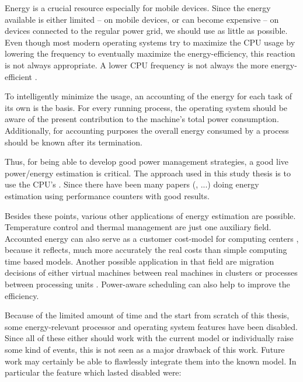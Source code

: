 
Energy is a crucial resource especially for mobile devices. Since the energy
available is either limited -- on mobile devices, or can become expensive -- on
devices connected to the regular power grid, we should use as little as
possible. Even though most modern operating systems try to maximize the CPU
usage by lowering the frequency \cite{snowdon2010operating} to eventually
maximize the energy-efficiency, this reaction is not always appropriate. A lower
CPU frequency is not always the more energy-efficient
\cite{weissel2002process,snowdon2010operating}.

To intelligently minimize the usage, an accounting of the energy for each task
of its own is the basis. For every running process, the operating system should
be aware of the present contribution to the machine's total power consumption.
Additionally, for accounting purposes the overall energy consumed by a process
should be known after its termination.

Thus, for being able to develop good power management strategies, a good live
power/energy estimation is critical. The approach used in this study thesis is
to use the CPU's .  Since
\cite{bellosa2000benefits} there have been many papers
(\cite{Bertran2010,bertran2010decomposable,kellner03tempcontrol,isci2003runtime,
weissel2002process}, ...) doing energy estimation using performance counters
with good results.

Besides these points, various other applications of energy estimation are
possible. Temperature control \cite{kellner03tempcontrol} and thermal management
\cite{merkel05tmsmpsys} are just one auxiliary field. Accounted energy can also
serve as a customer cost-model for computing centers \cite{Bertran2010}, because
it reflects, much more accurately the real costs than simple computing time
based models. Another possible application in that field are migration decisions
of either virtual machines between real machines in clusters or processes
between processing units \cite{merkel10rcscheduling}. Power-aware scheduling can
also help to improve the efficiency.


\label{sec:restrictions}

Because of the limited amount of time and the start from scratch of this thesis,
some energy-relevant processor and operating system features have been disabled.
Since all of these either should work with the current model or individually
raise some kind of events, this is not seen as a major drawback of this work.
Future work may certainly be able to flawlessly integrate them into the known
model. In particular the feature which lasted disabled were:

